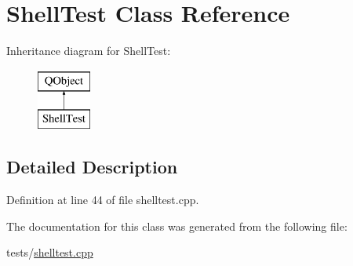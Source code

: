 \hypertarget{classShellTest}{\section{Shell\+Test Class Reference}
\label{classShellTest}
}
Inheritance diagram for Shell\+Test\+:\begin{figure}[H]
\begin{center}
\leavevmode
\includegraphics[height=2.000000cm]{classShellTest}
\end{center}
\end{figure}


\subsection{Detailed Description}


Definition at line 44 of file shelltest.\+cpp.



The documentation for this class was generated from the following file\+:\begin{DoxyCompactItemize}
\item 
tests/\hyperlink{shelltest_8cpp}{shelltest.\+cpp}\end{DoxyCompactItemize}
